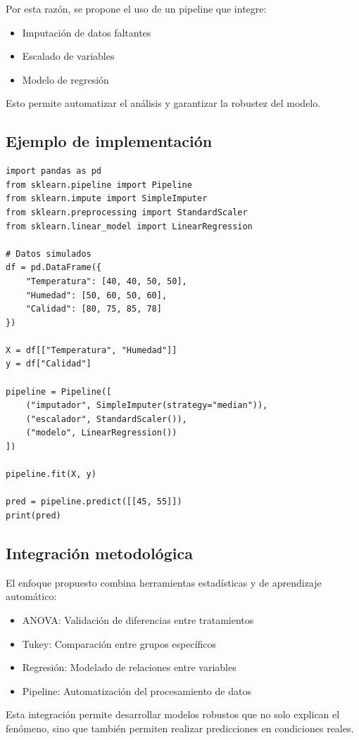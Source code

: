 Por esta razón, se propone el uso de un pipeline que integre:

\begin{itemize}
    \item Imputación de datos faltantes
    \item Escalado de variables
    \item Modelo de regresión
\end{itemize}

Esto permite automatizar el análisis y garantizar la robustez del modelo.

\subsection{Ejemplo de implementación}

\begin{lstlisting}
import pandas as pd
from sklearn.pipeline import Pipeline
from sklearn.impute import SimpleImputer
from sklearn.preprocessing import StandardScaler
from sklearn.linear_model import LinearRegression

# Datos simulados
df = pd.DataFrame({
    "Temperatura": [40, 40, 50, 50],
    "Humedad": [50, 60, 50, 60],
    "Calidad": [80, 75, 85, 78]
})

X = df[["Temperatura", "Humedad"]]
y = df["Calidad"]

pipeline = Pipeline([
    ("imputador", SimpleImputer(strategy="median")),
    ("escalador", StandardScaler()),
    ("modelo", LinearRegression())
])

pipeline.fit(X, y)

pred = pipeline.predict([[45, 55]])
print(pred)
\end{lstlisting}

\subsection{Integración metodológica}

El enfoque propuesto combina herramientas estadísticas y de aprendizaje automático:

\begin{itemize}
    \item ANOVA: Validación de diferencias entre tratamientos
    \item Tukey: Comparación entre grupos específicos
    \item Regresión: Modelado de relaciones entre variables
    \item Pipeline: Automatización del procesamiento de datos
\end{itemize}

Esta integración permite desarrollar modelos robustos que no solo explican el fenómeno, sino que también permiten realizar predicciones en condiciones reales.